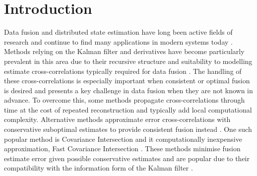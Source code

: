 \documentclass[letterpaper, 10 pt, conference]{ieeeconf}
\begin{document}
\section{Introduction}\label{sec:introduction}
Data fusion and distributed state estimation have long been active fields of research and continue to find many applications in modern systems today \cite{andersonOptimalFiltering1979,simonOptimalStateEstimation2006}. Methods relying on the Kalman filter and derivatives \cite{haugBayesianEstimationTracking2012} have become particularly prevalent in this area due to their recursive structure and suitability to modelling estimate cross-correlations typically required for data fusion \cite{mutambaraDecentralizedEstimationControl1998,ligginsDistributedDataFusion2012}. The handling of these cross-correlations is especially important when consistent or optimal fusion is desired \cite{bar-shalomTracktotrackCorrelationProblem1981,sunMultisensorOptimalInformation2004} and presents a key challenge in data fusion when they are not known in advance. To overcome this, some methods propagate cross-correlations through time at the cost of repeated reconstruction \cite{steinbringOptimalSamplebasedFusion2016} and typically add local computational complexity. Alternative methods approximate error cross-correlations with conservative suboptimal estimates to provide consistent fusion instead \cite{julierNondivergentEstimationAlgorithm1997,noackDecentralizedDataFusion2017,niehsenInformationFusionBased2002}. One such popular method is Covariance Intersection \cite{julierNondivergentEstimationAlgorithm1997} and it computationally inexpensive approximation, Fast Covariance Intersection \cite{niehsenInformationFusionBased2002}. These methods minimise fusion estimate error given possible conservative estimates and are popular due to their compatibility with the information form of the Kalman filter \cite{mutambaraDecentralizedEstimationControl1998,pfaffInformationFormDistributed2017}.
\end{document}
